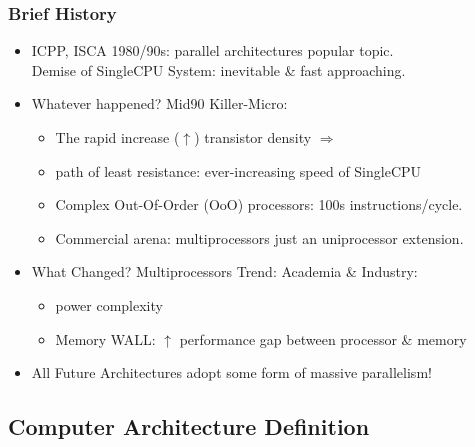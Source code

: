 \documentclass{beamer}
\renewcommand{\emph}[1]{\textcolor{structure}{#1}}
\newcommand{\emp}[1]{\textcolor{DikuRed}{ #1}}
\begin{document}
\begin{frame}[fragile,t]
\frametitle{Brief History}

\begin{itemize}
        \item \emph{ICPP, ISCA 1980/90s: parallel architectures popular topic.}\\
              Demise of SingleCPU System: inevitable \& fast approaching.\bigskip

        \item \alert{Whatever happened? Mid90 Killer-Micro:}
        \begin{itemize}
            \item The rapid increase ($\uparrow$) transistor density $\Rightarrow$\\
            \item path of least resistance: ever-increasing speed of SingleCPU
            \item Complex Out-Of-Order (OoO) processors: 100s instructions/cycle.
            \item Commercial arena: multiprocessors just an uniprocessor extension.
        \end  {itemize}\bigskip

        \item \alert{What Changed?} Multiprocessors Trend: Academia \& Industry:
        \begin{itemize}
            \item \emp{power complexity}
            \item \emp{Memory WALL}: $\uparrow$ performance gap between processor \& memory 
        \end  {itemize}\bigskip

       \item \emph{All Future Architectures adopt some form of massive parallelism!}
\end{itemize}

\end{frame}


\subsection{Computer Architecture Definition}
\end{document}
